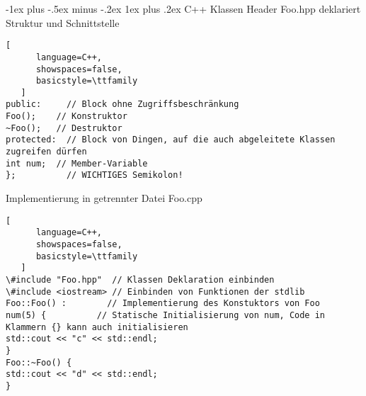 \documentclass[10pt]{article}
\makeatletter
\renewcommand{\subsubsection}{\@startsection{subsubsection}{3}{0mm}%
                                {-1ex plus -.5ex minus -.2ex}%
                                {1ex plus .2ex}%
                                {\normalfont\small\bfseries}}
\makeatother
\begin{document}
\subsubsection{C++ Klassen}
Header Foo.hpp deklariert Struktur und Schnittstelle
\begin{lstlisting}[
      language=C++,
      showspaces=false,
      basicstyle=\ttfamily
   ]
public:     // Block ohne Zugriffsbeschränkung
Foo();    // Konstruktor
~Foo();   // Destruktor
protected:  // Block von Dingen, auf die auch abgeleitete Klassen zugreifen dürfen
int num;  // Member-Variable
};          // WICHTIGES Semikolon!
\end{lstlisting}


Implementierung in getrennter Datei Foo.cpp
\begin{lstlisting}[
      language=C++,
      showspaces=false,
      basicstyle=\ttfamily
   ]
\#include "Foo.hpp"  // Klassen Deklaration einbinden
\#include <iostream> // Einbinden von Funktionen der stdlib
Foo::Foo() :        // Implementierung des Konstuktors von Foo
num(5) {          // Statische Initialisierung von num, Code in Klammern {} kann auch initialisieren
std::cout << "c" << std::endl;
}
Foo::~Foo() {
std::cout << "d" << std::endl;
}
\end{lstlisting}
\end{document}
